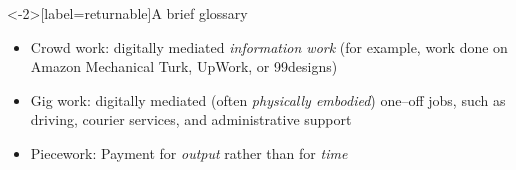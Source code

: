 \documentclass[presentation]{subfiles}
\begin{document}

\begin{frame}<-2>[label=returnable]{A brief glossary}
      \begin{itemize}
        \item<1-> \alert{Crowd work}: digitally mediated \emph{information work}
        (for example, work done on Amazon Mechanical Turk, UpWork, or 99designs)~\cite{crowdworkFuture}
        \item<2-> \alert{Gig work}: digitally mediated (often \emph{physically embodied}) one--off jobs,
        such as
        {driving},
        {courier services},
        and {administrative support}~\cite{friedman2014workers,Parigi:2016:GE:3026779.3013496}
        \item<3-> \alert{Piecework}: Payment for \emph{output} rather than for \emph{time}
      \end{itemize}
\end{frame}
\end{document}

